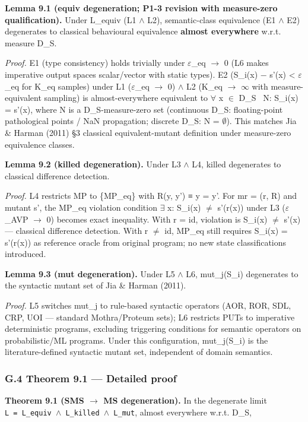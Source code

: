 \documentclass[review,12pt,authoryear]{elsarticle}
\begin{document}
\textbf{Lemma 9.1 (equiv degeneration; P1-3 revision with measure-zero
qualification).} Under L\_equiv (L1 $\wedge$ L2), semantic-class equivalence
(E1 $\wedge$ E2) degenerates to classical behavioural equivalence
\textbf{almost everywhere} w.r.t. measure D\_S.

\emph{Proof.} E1 (type consistency) holds trivially under $\varepsilon$\_eq $\to$ 0 (L6
makes imperative output spaces scalar/vector with static types). E2
(\textbar S\_i(x) − s'(x)\textbar{} \textless{} $\varepsilon$\_eq for K\_eq samples)
under L1 ($\varepsilon$\_eq $\to$ 0) $\wedge$ L2 (K\_eq $\to$ $\infty$ with measure-equivalent sampling)
is almost-everywhere equivalent to $\forall$ x $\in$ D\_S ~N: S\_i(x) = s'(x), where
N is a D\_S-measure-zero set (continuous D\_S: floating-point
pathological points / NaN propagation; discrete D\_S: N = $\emptyset$). This
matches Jia \& Harman (2011) §3 classical equivalent-mutant definition
under measure-zero equivalence classes.

\textbf{Lemma 9.2 (killed degeneration).} Under L3 $\wedge$ L4, killed
degenerates to classical difference detection.

\emph{Proof.} L4 restricts MP to \{MP\_eq\} with R(y, y') ≡ y = y'. For
mr = (r, R) and mutant s', the MP\_eq violation condition $\exists$ x: S\_i(x) $\neq$
s'(r(x)) under L3 ($\varepsilon$\_AVP $\to$ 0) becomes exact inequality. With r = id,
violation is S\_i(x) $\neq$ s'(x) --- classical difference detection. With r
$\neq$ id, MP\_eq still requires S\_i(x) = s'(r(x)) as reference oracle from
original program; no new state classifications introduced.

\textbf{Lemma 9.3 (mut degeneration).} Under L5 $\wedge$ L6, mut\_j(S\_i)
degenerates to the syntactic mutant set of Jia \& Harman (2011).

\emph{Proof.} L5 switches mut\_j to rule-based syntactic operators (AOR,
ROR, SDL, CRP, UOI --- standard Mothra/Proteum sets); L6 restricts PUTs
to imperative deterministic programs, excluding triggering conditions
for semantic operators on probabilistic/ML programs. Under this
configuration, mut\_j(S\_i) is the literature-defined syntactic mutant
set, independent of domain semantics.

\subsubsection{G.4 Theorem 9.1 --- Detailed proof}\label{g.4-theorem-9.1-detailed-proof}

\textbf{Theorem 9.1 (SMS $\to$ MS degeneration).} In the degenerate limit
\texttt{L\ =\ L\_equiv\ $\wedge$\ L\_killed\ $\wedge$\ L\_mut}, almost everywhere
w.r.t. D\_S,
\end{document}
